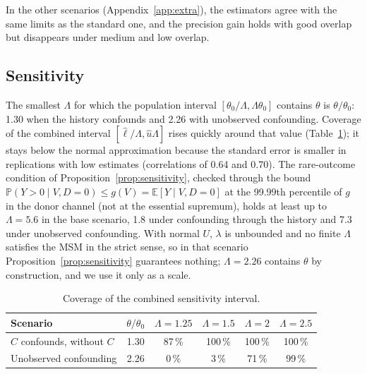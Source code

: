 \documentclass[twoside,11pt]{article}
\newcommand{\E}{\mathbb{E}}
\newcommand{\PP}{\mathbb{P}}
\theoremstyle{plain}
\theoremstyle{definition}
\begin{document}
In the other scenarios (Appendix~\ref{app:extra}), the estimators agree with the same limits as the standard one, and the precision gain holds with good overlap but disappears under medium and low overlap.

\subsection{Sensitivity}\label{sec:res-sensitivity}

The smallest $\Lambda$ for which the population interval $[\theta_0/\Lambda,\Lambda\theta_0]$ contains $\theta$ is $\theta/\theta_0$: 1.30 when the history confounds and 2.26 with unobserved confounding. Coverage of the combined interval $[\hat\ell/\Lambda,\hat u\Lambda]$ rises quickly around that value (Table~\ref{tab:sensitivity}); it stays below the normal approximation because the standard error is smaller in replications with low estimates (correlations of 0.64 and 0.70). The rare-outcome condition of Proposition~\ref{prop:sensitivity}, checked through the bound $\PP(Y>0\mid V,D=0)\le g(V)=\E[Y\mid V,D=0]$ at the 99.99th percentile of $g$ in the donor channel (not at the essential supremum), holds at least up to $\Lambda=5.6$ in the base scenario, 1.8 under confounding through the history and 7.3 under unobserved confounding. With normal $U$, $\lambda$ is unbounded and no finite $\Lambda$ satisfies the MSM in the strict sense, so in that scenario Proposition~\ref{prop:sensitivity} guarantees nothing; $\Lambda=2.26$ contains $\theta$ by construction, and we use it only as a scale.

\begin{table}[ht]
\centering\small
\caption{Coverage of the combined sensitivity interval.}\label{tab:sensitivity}
\begin{tabular}{@{}lccccc@{}}
\toprule
Scenario & $\theta/\theta_0$ & $\Lambda=1.25$ & $\Lambda=1.5$ & $\Lambda=2$ & $\Lambda=2.5$ \\
\midrule
$C$ confounds, without $C$ & 1.30 & 87\,\% & 100\,\% & 100\,\% & 100\,\% \\
Unobserved confounding & 2.26 & 0\,\% & 3\,\% & 71\,\% & 99\,\% \\
\bottomrule
\end{tabular}
\end{table}
\end{document}
